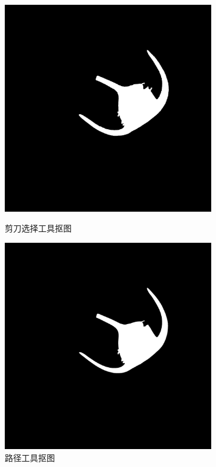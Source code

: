 \documentclass[12pt]{article}
\begin{document}
\begin{figure}[htbp]
\begin{minipage}{0.5\textwidth}
\centering
\includegraphics[width=3.6in]{womenjian.png}
\caption{剪刀选择工具抠图}
\label{8}
\end{minipage}
\begin{minipage}{0.5\textwidth}
\centering
\includegraphics[width=3.6in]{womengang.png}
\caption{路径工具抠图}
\label{9}
\end{minipage}
\end{figure}
\end{document}
